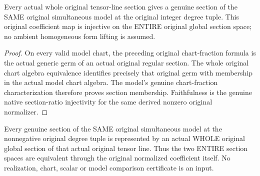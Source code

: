 \begin{theorem}\label{thm:original-whole-tensor-model-section-image}
\leanok
{}
Every actual whole original tensor-line section gives a genuine section of the SAME original simultaneous model at the original integer degree tuple. This original coefficient map is injective on the ENTIRE original global section space; no ambient homogeneous form lifting is assumed.
\end{theorem}
\begin{proof}
On every valid model chart, the preceding original chart-fraction formula is the actual generic germ of an actual original regular section. The whole original chart algebra equivalence identifies precisely that original germ with membership in the actual model chart algebra. The model's genuine chart-fraction characterization therefore proves section membership. Faithfulness is the genuine native section-ratio injectivity for the same derived nonzero original normalizer.
\end{proof}
\begin{theorem}\label{thm:original-whole-tensor-model-section-realization}
\leanok
{}
Every genuine section of the SAME original simultaneous model at the nonnegative original degree tuple is represented by an actual WHOLE original global section of that actual original tensor line. Thus the two ENTIRE section spaces are equivalent through the original normalized coefficient itself. No realization, chart, scalar or model comparison certificate is an input.
\end{theorem}
